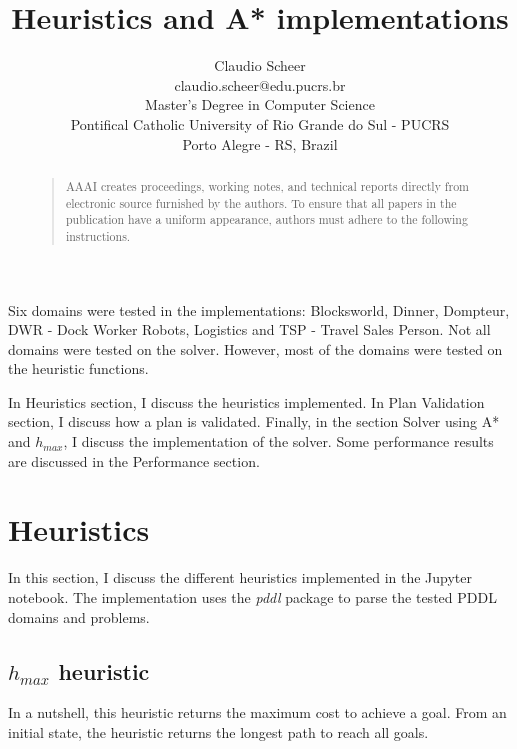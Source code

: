 \documentclass[letterpaper]{article}
\begin{document}
\title{Heuristics and A* implementations}
\author{Claudio Scheer\\
  claudio.scheer@edu.pucrs.br\\
  Master's Degree in Computer Science\\
  Pontifical Catholic University of Rio Grande do Sul - PUCRS\\
  Porto Alegre - RS, Brazil\\
}
\maketitle
\begin{abstract}
  \begin{quote}
    AAAI creates proceedings, working notes, and technical reports directly from electronic source furnished by the authors. To ensure that all papers in the publication have a uniform appearance, authors must adhere to the following instructions.
  \end{quote}
\end{abstract}


\noindent Six domains were tested in the implementations: Blocksworld, Dinner, Dompteur, DWR - Dock Worker Robots, Logistics and TSP - Travel Sales Person. Not all domains were tested on the solver. However, most of the domains were tested on the heuristic functions.

In Heuristics section, I discuss the heuristics implemented. In Plan Validation section, I discuss how a plan is validated. Finally, in the section Solver using A* and $h_{max}$, I discuss the implementation of the solver. Some performance results are discussed in the Performance section.

\section{Heuristics}
In this section, I discuss the different heuristics implemented in the Jupyter notebook. The implementation uses the \textit{pddl} package to parse the tested PDDL domains and problems.

\subsection{$h_{max}$ heuristic}
In a nutshell, this heuristic returns the maximum cost to achieve a goal. From an initial state, the heuristic returns the longest path to reach all goals.


\end{document}
